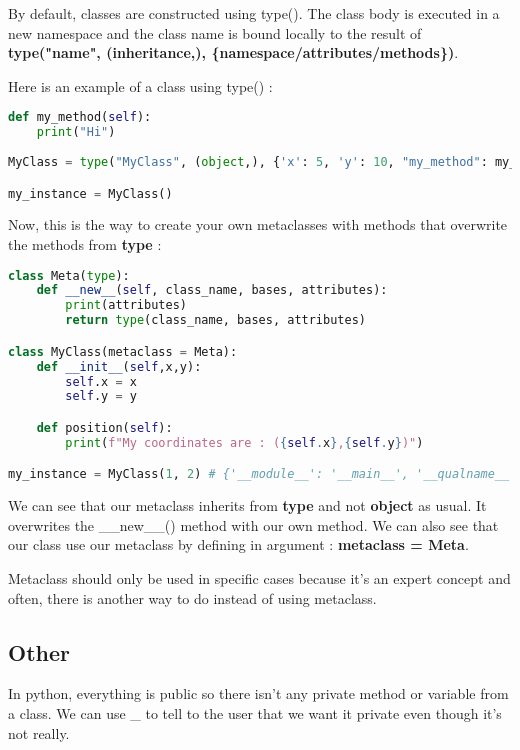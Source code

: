 \documentclass[a4paper, 12pt, titlepage]{scrartcl} %
\begin{document}
By default, classes are constructed using type(). The class body is executed in a new namespace and the class name is bound locally to the result of \textbf{type("name", (inheritance,), \{namespace/attributes/methods\})}.

\vspace{5mm}

Here is an example of a class using type() :
\begin{lstlisting}[language=Python]
def my_method(self):
    print("Hi")
    
MyClass = type("MyClass", (object,), {'x': 5, 'y': 10, "my_method": my_method}) #don't forget the coma after object

my_instance = MyClass()
\end{lstlisting} \vspace{5mm}

Now, this is the way to create your own metaclasses with methods that overwrite the methods from \textbf{type} :
\begin{lstlisting}[language=Python]
class Meta(type):
	def __new__(self, class_name, bases, attributes):
		print(attributes)
		return type(class_name, bases, attributes)

class MyClass(metaclass = Meta):
	def __init__(self,x,y):
		self.x = x
		self.y = y

	def position(self):
		print(f"My coordinates are : ({self.x},{self.y})")

my_instance = MyClass(1, 2) # {'__module__': '__main__', '__qualname__': 'MyClass', '__init__': <function MyClass.__init__ at 0x7f3998be1f70>, 'position': <function MyClass.position at 0x7f3998c00160>}
\end{lstlisting} \vspace{5mm}

We can see that our metaclass inherits from \textbf{type} and not \textbf{object} as usual. It overwrites the \_\_new\_\_() method with our own method. We can also see that our class use our metaclass by defining in argument : \textbf{metaclass = Meta}.

\vspace{5mm}

Metaclass should only be used in specific cases because it's an expert concept and often, there is another way to do instead of using metaclass.

\subsection{Other}
In python, everything is public so there isn't any private method or variable from a class. We can use \_ to tell to the user that we want it private even though it's not really.
\end{document}
